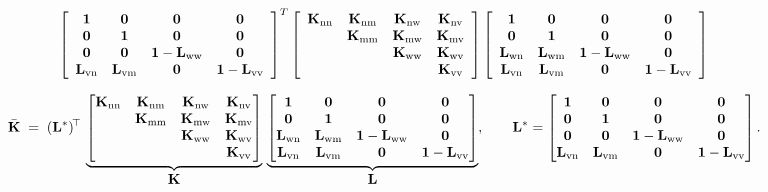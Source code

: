 $$
\left[\begin{array}{cccc}
\mathbf{1} & \mathbf{0} & \mathbf{0} & \mathbf{0} \\
\mathbf{0} & \mathbf{1} & \mathbf{0} & \mathbf{0} \\
\mathbf{0} & \mathbf{0} & \mathbf{1}-\mathbf{L}_{\rm ww} & \mathbf{0} \\
\mathbf{L}_{\rm vn} & \mathbf{L}_{\rm vm} & \mathbf{0} & \mathbf{1}-\mathbf{L}_{\rm vv}
\end{array}\right]^T
\left[\begin{array}{cccc}
\mathbf{K}_{\rm n n} & \mathbf{K}_{\rm n m} & \mathbf{K}_{\rm n w} & \mathbf{K}_{\rm n v} \\
& \mathbf{K}_{\rm m m} & \mathbf{K}_{\rm m w} & \mathbf{K}_{\rm m v} \\
& & \mathbf{K}_{\rm w w} & \mathbf{K}_{\rm w v} \\
& & & \mathbf{K}_{\rm v v}
\end{array}\right]
\left[\begin{array}{cccc}
\mathbf{1} & \mathbf{0} & \mathbf{0} & \mathbf{0} \\
\mathbf{0} & \mathbf{1} & \mathbf{0} & \mathbf{0} \\
\mathbf{L}_{\rm wn} & \mathbf{L}_{\rm wm} & \mathbf{1}-\mathbf{L}_{\rm ww} & \mathbf{0} \\
\mathbf{L}_{\rm vn} & \mathbf{L}_{\rm vm} & \mathbf{0} & \mathbf{1}-\mathbf{L}_{\rm vv}
\end{array}\right]
$$

\[
\bar{\mathbf K}\;=\;(\mathbf L^{*})^{\!\top}\,
\underbrace{\begin{bmatrix}
\mathbf{K}_{\rm nn} & \mathbf{K}_{\rm nm} & \mathbf{K}_{\rm nw} & \mathbf{K}_{\rm nv}\\
& \mathbf{K}_{\rm mm} & \mathbf{K}_{\rm mw} & \mathbf{K}_{\rm mv}\\
& & \mathbf{K}_{\rm ww} & \mathbf{K}_{\rm wv}\\
& & & \mathbf{K}_{\rm vv}
\end{bmatrix}}_{\displaystyle \mathbf K}
\,
\underbrace{\begin{bmatrix}
\mathbf{1} & \mathbf{0} & \mathbf{0} & \mathbf{0}\\
\mathbf{0} & \mathbf{1} & \mathbf{0} & \mathbf{0}\\
\mathbf{L}_{\rm wn} & \mathbf{L}_{\rm wm} & \mathbf{1}-\mathbf{L}_{\rm ww} & \mathbf{0}\\
\mathbf{L}_{\rm vn} & \mathbf{L}_{\rm vm} & \mathbf{0} & \mathbf{1}-\mathbf{L}_{\rm vv}
\end{bmatrix}}_{\displaystyle \mathbf L},
\qquad
\mathbf L^{*}=
\begin{bmatrix}
\mathbf{1} & \mathbf{0} & \mathbf{0} & \mathbf{0}\\
\mathbf{0} & \mathbf{1} & \mathbf{0} & \mathbf{0}\\
\mathbf{0} & \mathbf{0} & \mathbf{1}-\mathbf{L}_{\rm ww} & \mathbf{0}\\
\mathbf{L}_{\rm vn} & \mathbf{L}_{\rm vm} & \mathbf{0} & \mathbf{1}-\mathbf{L}_{\rm vv}
\end{bmatrix}.
\]

